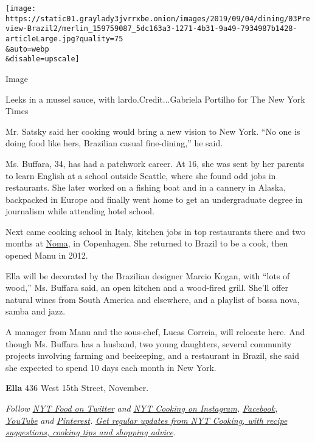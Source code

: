 \texttt{[image: https://static01.graylady3jvrrxbe.onion/images/2019/09/04/dining/03Preview-Brazil2/merlin\_159759087\_5dc163a3-1271-4b31-9a49-7934987b1428-articleLarge.jpg?quality=75\\\&auto=webp\\\&disable=upscale]}

Image

Leeks in a mussel sauce, with lardo.Credit...Gabriela Portilho for The
New York Times

Mr. Satsky said her cooking would bring a new vision to New York. ``No
one is doing food like hers, Brazilian casual fine-dining,'' he said.

Ms. Buffara, 34, has had a patchwork career. At 16, she was sent by her
parents to learn English at a school outside Seattle, where she found
odd jobs in restaurants. She later worked on a fishing boat and in a
cannery in Alaska, backpacked in Europe and finally went home to get an
undergraduate degree in journalism while attending hotel school.

Next came cooking school in Italy, kitchen jobs in top restaurants there
and two months at
\href{https://www.nytimes3xbfgragh.onion/2018/04/24/dining/noma-restaurant-copenhagen.html}{Noma},
in Copenhagen. She returned to Brazil to be a cook, then opened Manu in
2012.

Ella will be decorated by the Brazilian designer Marcio Kogan, with
``lots of wood,'' Ms. Buffara said, an open kitchen and a wood-fired
grill. She'll offer natural wines from South America and elsewhere, and
a playlist of bossa nova, samba and jazz.

A manager from Manu and the sous-chef, Lucas Correia, will relocate
here. And though Ms. Buffara has a husband, two young daughters, several
community projects involving farming and beekeeping, and a restaurant in
Brazil, she said she expected to spend 10 days each month in New York.

\textbf{Ella} 436 West 15th Street, November.

\emph{Follow} \href{https://twitter.com/nytfood}{\emph{NYT Food on
Twitter}} \emph{and}
\href{https://www.instagram.com/nytcooking/}{\emph{NYT Cooking on
Instagram}}\emph{,}
\href{https://www.facebookcorewwwi.onion/nytcooking/}{\emph{Facebook}}\emph{,}
\href{https://www.youtube.com/nytcooking}{\emph{YouTube}} \emph{and}
\href{https://www.pinterest.com/nytcooking/}{\emph{Pinterest}}\emph{.}
\href{https://www.nytimes3xbfgragh.onion/newsletters/cooking}{\emph{Get
regular updates from NYT Cooking, with recipe suggestions, cooking tips
and shopping advice}}\emph{.}

